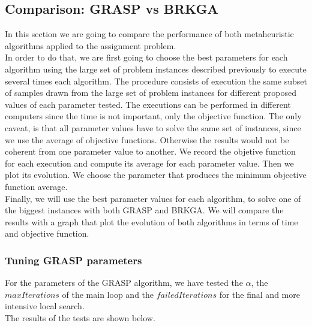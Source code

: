 \subsection{Comparison: GRASP vs BRKGA}

In this section we are going to compare the performance of both metaheuristic algorithms applied to the assignment problem.\\

In order to do that, we are first going to choose the best parameters for each algorithm using the large set of problem instances described previously to execute several times each algorithm. The procedure consists of execution the same subset of samples drawn from the large set of problem instances for different proposed values of each parameter tested. The executions can be performed in different computers since the time is not important, only the objective function. The only caveat, is that all parameter values have to solve the same set of instances, since we use the average of objective functions. Otherwise the results would not be coherent from one parameter value to another. We record the objetive function for each execution and compute its average for each parameter value. Then we plot its evolution. We choose the parameter that produces the minimum objective function average.\\

Finally, we will use the best parameter values for each algorithm, to solve one of the biggest instances with both GRASP and BRKGA. We will compare the results with a graph that plot the evolution of both algorithms in terms of time and objective function. \\


\subsubsection{Tuning GRASP parameters}

For the parameters of the GRASP algorithm, we have tested the $\alpha$, the $maxIterations$ of the main loop and the $failedIterations$ for the final and more intensive local search.\\
The results of the tests are shown below.

